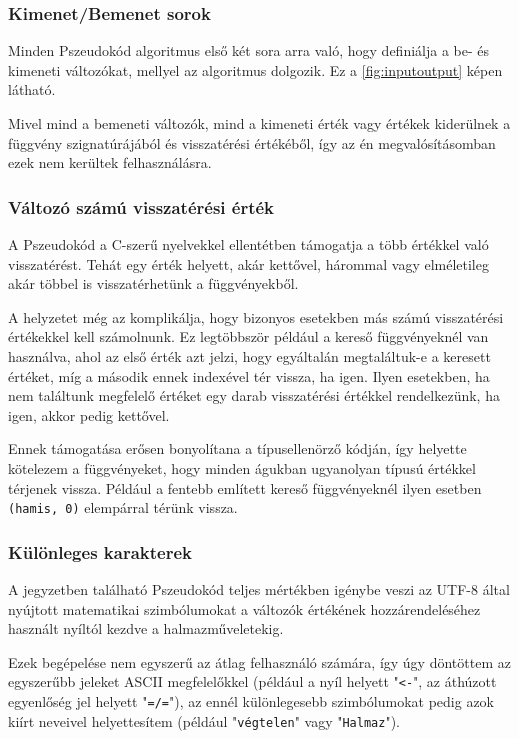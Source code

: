 \subsubsection{Kimenet/Bemenet sorok}

Minden Pszeudokód algoritmus első két sora arra való, hogy definiálja a be- és kimeneti változókat, mellyel az algoritmus dolgozik. Ez a \ref{fig:inputoutput} képen látható.


Mivel mind a bemeneti változók, mind a kimeneti érték vagy értékek kiderülnek a függvény szignatúrájából és visszatérési értékéből, így az én megvalósításomban ezek nem kerültek felhasználásra.

\subsubsection{Változó számú visszatérési érték}

A Pszeudokód a C-szerű nyelvekkel ellentétben támogatja a több értékkel való visszatérést. Tehát egy érték helyett, akár kettővel, hárommal vagy elméletileg akár többel is visszatérhetünk a függvényekből.

A helyzetet még az komplikálja, hogy bizonyos esetekben más számú visszatérési értékekkel kell számolnunk. Ez legtöbbször például a kereső függvényeknél van használva, ahol az első érték azt jelzi, hogy egyáltalán megtaláltuk-e a keresett értéket, míg a második ennek indexével tér vissza, ha igen. Ilyen esetekben, ha nem találtunk megfelelő értéket egy darab visszatérési értékkel rendelkezünk, ha igen, akkor pedig kettővel.

Ennek támogatása erősen bonyolítana a típusellenörző kódján, így helyette kötelezem a függvényeket, hogy minden águkban ugyanolyan típusú értékkel térjenek vissza. Például a fentebb említett kereső függvényeknél ilyen esetben \texttt{(hamis, 0)} elempárral térünk vissza.

\subsubsection{Különleges karakterek}

A jegyzetben található Pszeudokód teljes mértékben igénybe veszi az UTF-8 által nyújtott matematikai szimbólumokat a változók értékének hozzárendeléséhez használt nyíltól kezdve a halmazműveletekig.

Ezek begépelése nem egyszerű az átlag felhasználó számára, így úgy döntöttem az egyszerűbb jeleket ASCII megfelelőkkel (például a nyíl helyett "\texttt{<-}", az áthúzott egyenlőség jel helyett "\texttt{=/=}"), az ennél különlegesebb szimbólumokat pedig azok kiírt neveivel helyettesítem (például "\texttt{végtelen}" vagy "\texttt{Halmaz}").